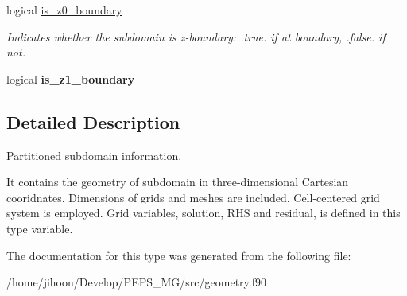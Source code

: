 \textbf{ }\par
\begin{DoxyCompactItemize}
\item 
\mbox{\label{structgeometry_1_1subdomain_a6d5a0e5ffccf550662c1358390343279}} 
logical \hyperlink{structgeometry_1_1subdomain_a6d5a0e5ffccf550662c1358390343279}{is\+\_\+z0\+\_\+boundary}
\begin{DoxyCompactList}\small\item\em Indicates whether the subdomain is z-\/boundary\+: .true. if at boundary, .false. if not. \end{DoxyCompactList}\item 
\mbox{\label{structgeometry_1_1subdomain_a462e04ec3b7c7bf80ff452c3d09e4fd5}} 
logical {\bfseries is\+\_\+z1\+\_\+boundary}
\end{DoxyCompactItemize}



\subsection{Detailed Description}
Partitioned subdomain information. 

It contains the geometry of subdomain in three-\/dimensional Cartesian cooridnates. Dimensions of grids and meshes are included. Cell-\/centered grid system is employed. Grid variables, solution, R\+HS and residual, is defined in this type variable. 

The documentation for this type was generated from the following file\+:\begin{DoxyCompactItemize}
\item 
/home/jihoon/\+Develop/\+P\+E\+P\+S\+\_\+\+M\+G/src/geometry.\+f90\end{DoxyCompactItemize}
